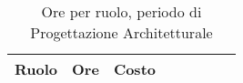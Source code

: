 \begin{center}
\begin{table}[H]
\begin{tabular}{lccccccc}
\toprule
    \textbf{Ruolo}  & \textbf{Ore} & \textbf{Costo} \\
    \midrule
    
    	
    
    \bottomrule
\end{tabular}
\caption{Ore per ruolo, periodo di Progettazione Architetturale}
\end{table}
\end{center}